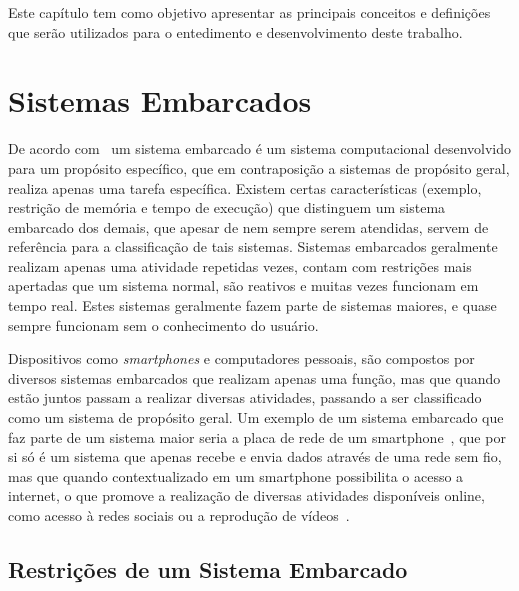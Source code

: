 \label{chapter:conceitos}
Este capítulo tem como objetivo apresentar as principais conceitos e definições que serão utilizados para o entedimento e desenvolvimento deste trabalho. 


\section{Sistemas Embarcados}%

De acordo com~ um sistema embarcado é um sistema computacional desenvolvido para um propósito específico, que em contraposição a sistemas de propósito geral, realiza apenas uma tarefa específica. Existem certas características (exemplo, restrição de memória e tempo de execução) que distinguem um sistema embarcado dos demais, que apesar de nem sempre serem atendidas, servem de referência para a classificação de tais sistemas. Sistemas embarcados geralmente realizam apenas uma atividade repetidas vezes, contam com restrições mais apertadas que um sistema normal, são reativos e muitas vezes funcionam em tempo real. Estes sistemas geralmente fazem parte de sistemas maiores, e quase sempre funcionam sem o conhecimento do usuário.

Dispositivos como \textit{smartphones} e computadores pessoais, são compostos por diversos sistemas embarcados que realizam apenas uma função, mas que quando estão juntos passam a realizar diversas atividades, passando a ser classificado como um sistema de propósito geral. Um exemplo de um sistema embarcado que faz parte de um sistema maior seria a placa de rede de um smartphone~\cite{qualcomm_2017}, que por si só é um sistema que apenas recebe e envia dados através de uma rede sem fio, mas que quando contextualizado em um smartphone possibilita o acesso a internet, o que promove a realização de diversas atividades disponíveis online, como acesso à redes sociais ou a reprodução de vídeos~\cite{VAHID:2001}.



\subsection{Restrições de um Sistema Embarcado} %


